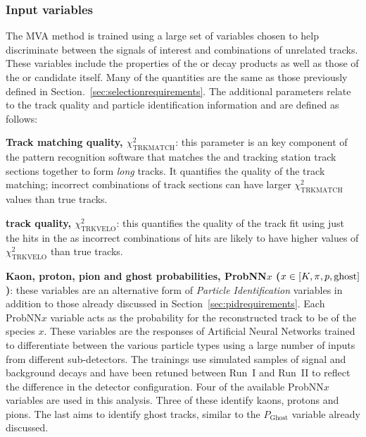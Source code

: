 
\subsubsection{Input variables}


The MVA method is trained using a large set of variables chosen to help discriminate between the signals of interest and combinations of unrelated tracks. These variables include the properties of the \Kpm or \pipm decay products as well as those of the \phiz or \Dsp candidate itself. Many of the quantities are the same as those previously defined in Section.~\ref{sec:selectionrequirements}. The additional parameters relate to the track quality and particle identification information and are defined as follows:

\begin{description}
\item \textbf{Track matching quality, $\chi^{2}_{\text{TRKMATCH}}$}: this parameter is an key component of the pattern recognition software that matches the \velo and tracking station track sections together to form \emph{long} tracks. It quantifies the quality of the track matching; incorrect combinations of track sections can have larger $\chi^{2}_{\text{TRKMATCH}}$ values than true tracks.  

\item \textbf{\velo track quality, $\chi^{2}_{\text{TRKVELO}}$}: this quantifies the quality of the track fit using just the hits in the \velo as incorrect combinations of hits are likely to have higher values of $\chi^{2}_{\text{TRKVELO}}$ than true tracks.  


\item \textbf{Kaon, proton, pion and ghost probabilities, ProbNN$x$ ($x\in[K,\pi,{p},\text{ghost}]$)}: these variables are an alternative form of \emph{Particle Identification} variables in addition to those already discussed in Section~\ref{sec:pidrequirements}. Each ProbNN$x$ variable acts as the probability for the reconstructed track to be of the species $x$. These variables are the responses of Artificial Neural Networks trained to differentiate between the various particle types using a large number of inputs from different sub-detectors. The trainings use simulated samples of signal and background decays and have been retuned between Run~I and Run~II to reflect the difference in the detector configuration. Four of the available ProbNN$x$ variables are used in this analysis. Three of these identify kaons, protons and pions. The last aims to identify ghost tracks, similar to the $P_{\text{Ghost}}$ variable already discussed. 
\end{description}

